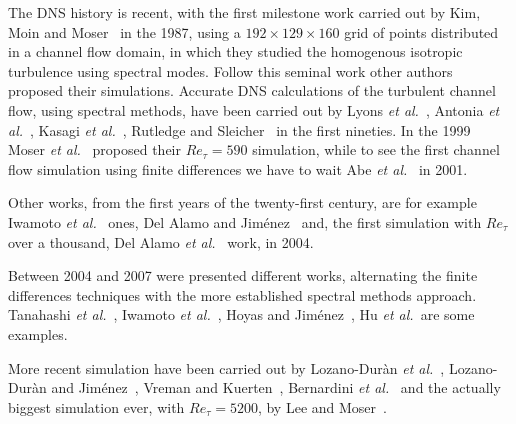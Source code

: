 The DNS history is recent, with the first milestone work carried out by Kim, Moin and Moser~\cite{kim_moin_moser} in the 1987, using a $192\times 129 \times160$ grid of points distributed in a channel flow domain, in which they studied the homogenous isotropic turbulence using spectral modes. Follow this seminal work other authors proposed their simulations.
Accurate DNS calculations of the turbulent channel flow, using spectral methods, have been carried out by Lyons \emph{et al.}~\cite{Lyons}, Antonia \emph{et al.}~\cite{antonia_teitel_kim_browne_1992}, Kasagi \emph{et al.}~\cite{Kasagi}, Rutledge and Sleicher~\cite{Rutledge} in the first nineties. In the 1999 Moser \emph{et al.}~\cite{KMMans} proposed their $Re_{\tau}=590$ simulation, while to see the first channel flow simulation using finite differences we have to wait Abe \emph{et al.}~\cite{Abe} in 2001.\par
Other works, from the first years of the twenty-first century, are for example Iwamoto \emph{et al.}~\cite{Iwamoto} ones, Del Alamo and Jiménez~\cite{delalamo} and, the first simulation with $Re_{\tau}$ over a thousand, Del Alamo \emph{et al.}~\cite{delalamo2} work, in 2004. \par
Between 2004 and 2007 were presented different works, alternating the finite differences techniques with the more established spectral methods approach.
Tanahashi \emph{et al.}~\cite{Tanahashi}, Iwamoto \emph{et al.}~\cite{Iwamoto2}, Hoyas and Jiménez~\cite{Hoyas}, Hu \emph{et al.}~\cite{Hu}are some examples. \par
More recent simulation have been carried out by Lozano-Duràn \emph{et al.}~\cite{Lozano}, Lozano-Duràn and Jiménez~\cite{Lozano2}, Vreman and Kuerten~\cite{Vreman}, Bernardini \emph{et al.}~\cite{Bernardini} and the actually biggest simulation ever, with $Re_{\tau}=5200$, by Lee and Moser~\cite{Lee}. \par

